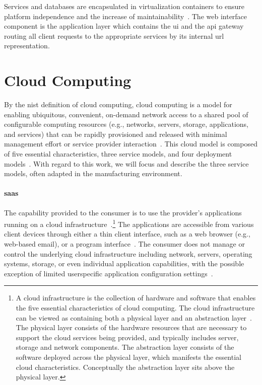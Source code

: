 \documentclass[
a4paper,
twoside,
headsepline,
cleardoublepage=empty,
parskip=half,
draft=false
]{scrbook}
\begin{document}
			Services and databases are encapsulated in virtualization containers to ensure platform independence and the increase of maintainability~\cite{xen.17b}. 
			The web interface component is the application layer which contains the \gls{ui} and the \gls{api} gateway routing all client requests to the appropriate services by its internal \gls{url} representation. 
			
		\section{Cloud Computing}\label{sec:cloud_computing}
		
			By the \gls{nist} definition of cloud computing, cloud computing is a model for enabling ubiquitous, convenient, on-demand network access to a shared pool of configurable computing resources (e.g., networks, servers, storage, applications, and services) that can be rapidly provisioned and released with minimal management effort or service provider interaction~\cite{mell2011nist}.
			This cloud model is composed of five essential characteristics, three service models, and four deployment
			models~\cite{fehling2014cloud}. With regard to this work, we will focus and describe the three service models, often adapted in the manufacturing environment.
			
			\paragraph{\gls{saas}} The capability provided to the consumer is to use the provider's applications running on a cloud infrastructure~\cite{mell2011nist}.\footnote{A cloud infrastructure is the collection of hardware and software that enables the five essential characteristics of cloud computing. The cloud infrastructure can be viewed as containing both a physical layer and an abstraction layer~\cite{fehling2014cloud}. The physical layer consists of the hardware resources that are necessary to support the cloud services being provided, and typically includes server, storage and network components. The abstraction layer consists of the software deployed across the physical layer, which manifests the essential cloud characteristics. Conceptually the abstraction layer sits above the physical layer.}
			The applications are accessible from various client devices through either a thin client interface, such as a web browser (e.g., web-based email), or a program interface~\cite{mell2011nist}. 
			The consumer does not manage or control the underlying cloud infrastructure including network, servers, operating systems, storage, or even individual application capabilities, with the possible exception of limited userspecific application configuration settings~\cite{mell2011nist}.
			
\end{document}

